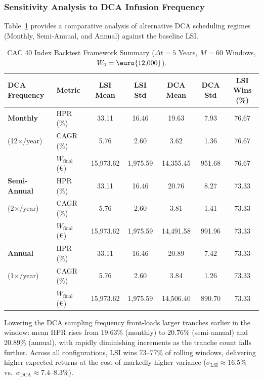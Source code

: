 \documentclass[11pt,a4paper]{article}
\begin{document}
\subsubsection{Sensitivity Analysis to DCA Infusion Frequency}

Table~\ref{tab:dca_frequency} provides a comparative analysis of alternative DCA scheduling regimes (Monthly, Semi-Annual, and Annual) against the baseline LSI.

\begin{table}[htbp]
\centering
\caption{CAC 40 Index Backtest Framework Summary ($\Delta t = 5$ Years, $M = 60$ Windows, $W_0 = \text{\euro{12,000}}$).}
\label{tab:dca_frequency}
\small
\begin{tabular}{llccccc}
\hline
\textbf{DCA Frequency} & \textbf{Metric} & \textbf{LSI Mean} & \textbf{LSI Std} & \textbf{DCA Mean} & \textbf{DCA Std} & \textbf{LSI Wins (\%)} \\ \hline
\textbf{Monthly} & HPR (\%) & 33.11 & 16.46 & 19.63 & 7.93 & 76.67 \\
(12$\times$/year) & CAGR (\%) & 5.76 & 2.60 & 3.62 & 1.36 & 76.67 \\
 & $W_{\text{final}}$ (\euro{}) & 15,973.62 & 1,975.59 & 14,355.45 & 951.68 & 76.67 \\ \hline
\textbf{Semi-Annual} & HPR (\%) & 33.11 & 16.46 & 20.76 & 8.27 & 73.33 \\
(2$\times$/year) & CAGR (\%) & 5.76 & 2.60 & 3.81 & 1.41 & 73.33 \\
 & $W_{\text{final}}$ (\euro{}) & 15,973.62 & 1,975.59 & 14,491.58 & 991.96 & 73.33 \\ \hline
\textbf{Annual} & HPR (\%) & 33.11 & 16.46 & 20.89 & 7.42 & 73.33 \\
(1$\times$/year) & CAGR (\%) & 5.76 & 2.60 & 3.84 & 1.26 & 73.33 \\
 & $W_{\text{final}}$ (\euro{}) & 15,973.62 & 1,975.59 & 14,506.40 & 890.70 & 73.33 \\ \hline
\end{tabular}
\end{table}

Lowering the DCA sampling frequency front-loads larger tranches earlier in the window: mean HPR rises from 19.63\% (monthly) to 20.76\% (semi-annual) and 20.89\% (annual), with rapidly diminishing increments as the tranche count falls further. Across all configurations, LSI wins 73--77\% of rolling windows, delivering higher expected returns at the cost of markedly higher variance ($\sigma_{\text{LSI}} \approx 16.5\%$ vs.\ $\sigma_{\text{DCA}} \approx 7.4$--$8.3\%$).
\end{document}
